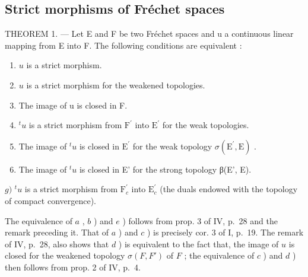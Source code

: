 \subsection{Strict morphisms of Fréchet spaces}

THEOREM 1. --- Let E and F be two Fréchet spaces and u a continuous linear mapping from E into F. The following conditions are equivalent :

\begin{enumerate}
\def\labelenumi{\alph{enumi})}
\item
  \(u\) is a strict morphism.
\item
  \(u\) is a strict morphism for the weakened topologies.
\item
  The image of u is closed in F.
\item
  \({}^t u\) is a strict morphism from \({\mathrm{F}}^{\prime }\) into \({\mathrm{E}}^{\prime }\) for the weak topologies.
\item
  The image of \({}^t u\) is closed in \({\mathrm{E}}^{\prime }\) for the weak topology \(\sigma \left( {{\mathrm{E}}^{\prime },\mathrm{E}}\right)\) .
\item
  The image of \({}^t u\) is closed in E' for the strong topology β(E', E).
\end{enumerate}

\(g)\) \({}^t u\) is a strict morphism from \(\mathrm{F}_c^\prime\) into \(\mathrm{E}_c^\prime\) (the duals endowed with the topology of compact convergence).

The equivalence of \(a\) , \(b\) ) and \(e\) ) follows from prop. 3 of IV, p.~28 and the remark preceding it. That of \(a\) ) and \(c\) ) is precisely cor. 3 of I, p.~19. The remark of IV, p.~28, also shows that \(d\) ) is equivalent to the fact that, the image of \(u\) is closed for the weakened topology \(\sigma(F, F')\) of \(F\) ; the equivalence of \(c\) ) and \(d\) ) then follows from prop. 2 of IV, p.~4.

